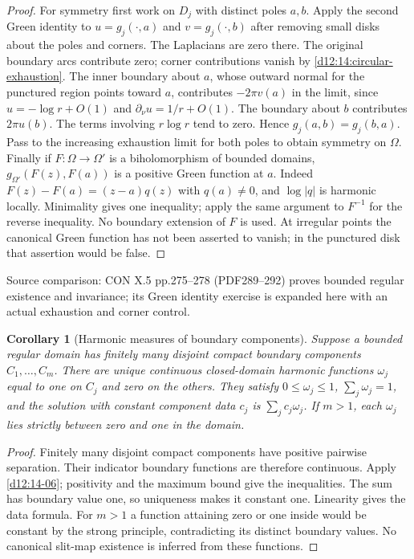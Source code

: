 \documentclass[11pt,a4paper,openany]{book}
\newtheorem{corollary}[theorem]{Corollary}
\theoremstyle{definition}
\theoremstyle{remark}\newtheorem{remark}[theorem]{Remark}
\newcommand{\family}[1]{}
\newcommand{\source}[1]{\par\begingroup\small\sffamily\color{black!65}Source comparison: #1\par\endgroup}
\begin{document}
\begin{proof}
For symmetry first work on $D_j$ with distinct poles $a,b$. Apply the second Green identity to $u=g_j(\cdot,a)$ and $v=g_j(\cdot,b)$ after removing small disks about the poles and corners. The Laplacians are zero there. The original boundary arcs contribute zero; corner contributions vanish by \cref{d12:14:circular-exhaustion}. The inner boundary about $a$, whose outward normal for the punctured region points toward $a$, contributes $-2\pi v(a)$ in the limit, since $u=-\log r+O(1)$ and $\partial_\nu u=1/r+O(1)$. The boundary about $b$ contributes $2\pi u(b)$. The terms involving $r\log r$ tend to zero. Hence $g_j(a,b)=g_j(b,a)$. Pass to the increasing exhaustion limit for both poles to obtain symmetry on $\Omega$.
Finally if $F:\Omega\to\Omega'$ is a biholomorphism of bounded domains, $g_{\Omega'}(F(z),F(a))$ is a positive Green function at $a$. Indeed $F(z)-F(a)=(z-a)q(z)$ with $q(a)\ne0$, and $\log|q|$ is harmonic locally. Minimality gives one inequality; apply the same argument to $F^{-1}$ for the reverse inequality. No boundary extension of $F$ is used. At irregular points the canonical Green function has not been asserted to vanish; in the punctured disk that assertion would be false.
\end{proof}
\source{CON X.5 pp.275--278 (PDF289--292) proves bounded regular existence and invariance; its Green identity exercise is expanded here with an actual exhaustion and corner control.}

\begin{corollary}[Harmonic measures of boundary components]\family{D12.14.08}\label{d12:14-08}
Suppose a bounded regular domain has finitely many disjoint compact boundary components $C_1,\ldots,C_m$. There are unique continuous closed-domain harmonic functions $\omega_j$ equal to one on $C_j$ and zero on the others. They satisfy $0\le\omega_j\le1$, $\sum_j\omega_j=1$, and the solution with constant component data $c_j$ is $\sum_jc_j\omega_j$. If $m>1$, each $\omega_j$ lies strictly between zero and one in the domain.
\end{corollary}
\begin{proof}
Finitely many disjoint compact components have positive pairwise separation. Their indicator boundary functions are therefore continuous. Apply \cref{d12:14-06}; positivity and the maximum bound give the inequalities. The sum has boundary value one, so uniqueness makes it constant one. Linearity gives the data formula. For $m>1$ a function attaining zero or one inside would be constant by the strong principle, contradicting its distinct boundary values. No canonical slit-map existence is inferred from these functions.
\end{proof}
\end{document}
